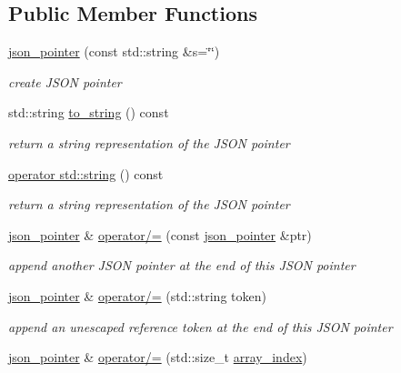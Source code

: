 \subsection*{Public Member Functions}
\begin{DoxyCompactItemize}
\item 
\hyperlink{classnlohmann_1_1json__pointer_a7f32d7c62841f0c4a6784cf741a6e4f8}{json\+\_\+pointer} (const std\+::string \&s=\char`\"{}\char`\"{})
\begin{DoxyCompactList}\small\item\em create J\+S\+ON pointer \end{DoxyCompactList}\item 
std\+::string \hyperlink{classnlohmann_1_1json__pointer_a3d4b15d32d096e3776c5d2c773b524f5}{to\+\_\+string} () const
\begin{DoxyCompactList}\small\item\em return a string representation of the J\+S\+ON pointer \end{DoxyCompactList}\item 
\hyperlink{classnlohmann_1_1json__pointer_ae9015c658f99cf3d48a8563accc79988}{operator std\+::string} () const
\begin{DoxyCompactList}\small\item\em return a string representation of the J\+S\+ON pointer \end{DoxyCompactList}\item 
\hyperlink{classnlohmann_1_1json__pointer}{json\+\_\+pointer} \& \hyperlink{classnlohmann_1_1json__pointer_a7395bd0af29ac23fd3f21543c935cdfa}{operator/=} (const \hyperlink{classnlohmann_1_1json__pointer}{json\+\_\+pointer} \&ptr)
\begin{DoxyCompactList}\small\item\em append another J\+S\+ON pointer at the end of this J\+S\+ON pointer \end{DoxyCompactList}\item 
\hyperlink{classnlohmann_1_1json__pointer}{json\+\_\+pointer} \& \hyperlink{classnlohmann_1_1json__pointer_abdd21567b2b1d69329af0f520335e68b}{operator/=} (std\+::string token)
\begin{DoxyCompactList}\small\item\em append an unescaped reference token at the end of this J\+S\+ON pointer \end{DoxyCompactList}\item 
\hyperlink{classnlohmann_1_1json__pointer}{json\+\_\+pointer} \& \hyperlink{classnlohmann_1_1json__pointer_a64c8401529131bad1e486d91d703795f}{operator/=} (std\+::size\+\_\+t \hyperlink{classnlohmann_1_1json__pointer_ac53f5b79dd91da78743c437832f57ce4}{array\+\_\+index})

\end{DoxyCompactItemize}
